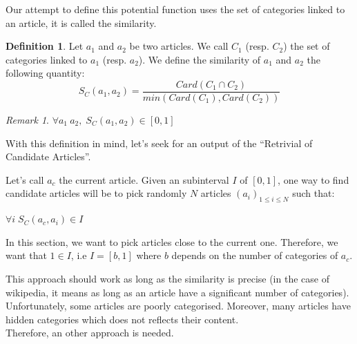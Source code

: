 \documentclass[11pt]{article}
\theoremstyle{plain}
\theoremstyle{definition}
\newtheorem{defn}{Definition}[section]
\theoremstyle{remark}
\newtheorem*{rem}{Remark}
\begin{document}
Our attempt to define this potential function uses the set of categories linked to an article, it is called the similarity.





\vspace*{5mm}
\begin{defn}
  Let $a_1$ and $a_2$ be two articles. We call $C_1$ (resp. $C_2$) the set of categories linked to $a_1$ (resp. $a_2$).
  We define the similarity of $a_1$ and $a_2$ the following quantity:\\
  \begin{equation*}
    S_C(a_1,a_2) = \frac{Card(C_1 \cap C_2)}{min(Card(C_1),Card(C_2))}
  \end{equation*}
\end{defn}

\begin{rem}
  $\forall a_1\: a_2,\; S_C(a_1,a_2) \in [0,1]$
\end{rem}

\vspace*{5mm}
With this definition in mind, let's seek for an output of the ``Retrivial of Candidate Articles''.


Let's call $a_c$ the current article.
Given an subinterval $I$ of $[0,1]$, one way to find candidate articles will be to pick randomly $N$ articles $(a_i)_{1 \leq i \leq N}$ such that:
\begin{center}
  $\forall i \; S_C(a_c,a_i) \in I$
\end{center}

In this section, we want to pick articles close to the current one. Therefore, we want that $1 \in I$, i.e $I=[b,1]$ where $b$ depends on the number of categories of $a_c$.



\vspace*{5mm}
This approach should work as long as the similarity is precise (in the case of wikipedia, it means as long as an article have a significant number of categories). Unfortunately, some articles are poorly categorised. Moreover, many articles have hidden categories which does not reflects their content. \\
Therefore, an other approach is needed.
\end{document}
